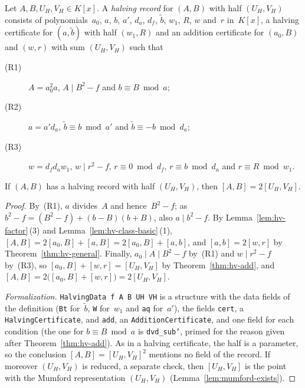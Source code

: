 \begin{definition}
\label{def:hv-record}
\leanok
{}
Let $A, B, U_H, V_H \in K[x]$. A \emph{halving record} for $(A, B)$ with half $(U_H, V_H)$
consists of polynomials~$a_0$, $a$, $b$, $a'$, $d_a$, $d_f$, $\tilde b$, $w_1$, $R$, $w$ and~$r$
in~$K[x]$, a halving certificate for $(a, \tilde b)$ with half $(w_1, R)$ and an addition
certificate for $(a_0, B)$ and $(w, r)$ with sum $(U_H, V_H)$ such that
\begin{description}
  \item[\textmd{(R1)}] $A = a_0^2 a$, $A \mid B^2 - f$ and $b \equiv B \bmod a$;
  \item[\textmd{(R2)}] $a = a' d_a$, $\tilde b \equiv b \bmod a'$ and
    $\tilde b \equiv -b \bmod d_a$;
  \item[\textmd{(R3)}] $w = d_f d_a w_1$, $w \mid r^2 - f$, $r \equiv 0 \bmod d_f$,
    $r \equiv b \bmod d_a$ and $r \equiv R \bmod w_1$.
\end{description}
\end{definition}

\begin{corollary}
\label{cor:hv-record}
\leanok
{}
If $(A, B)$ has a halving record with half $(U_H, V_H)$, then $[A, B] = 2[U_H, V_H]$.
\end{corollary}

\begin{proof}
\leanok
{}
By~(R1), $a$ divides~$A$ and hence~$B^2 - f$; as $b^2 - f = (B^2 - f) + (b - B)(b + B)$, also
$a \mid b^2 - f$. By Lemma~\ref{lem:hv-factor}\,(3) and Lemma~\ref{lem:hv-class-basic}\,(1),
$[A, B] = 2[a_0, B] + [a, B] = 2[a_0, B] + [a, b]$, and $[a, b] = 2[w, r]$ by
Theorem~\ref{thm:hv-general}. Finally, $a_0 \mid A \mid B^2 - f$ by~(R1) and $w \mid r^2 - f$
by~(R3), so $[a_0, B] + [w, r] = [U_H, V_H]$ by Theorem~\ref{thm:hv-add}, and
$[A, B] = 2\bigl([a_0, B] + [w, r]\bigr) = 2[U_H, V_H]$.

\emph{Formalization.} \texttt{HalvingData f A B UH VH} is a structure with the data fields of the
definition (\texttt{Bt} for~$\tilde b$, \texttt{W} for~$w_1$ and \texttt{aq} for~$a'$), the
fields \texttt{cert}, a \texttt{HalvingCertificate}, and \texttt{add}, an
\texttt{AdditionCertificate}, and one field for each condition (the one for
$b \equiv B \bmod a$ is \texttt{dvd\_sub'}, primed for the reason given after
Theorem~\ref{thm:hv-add}). As in a halving certificate, the half is a parameter, so the
conclusion $[A, B] = [U_H, V_H]^2$ mentions no field of the record. If moreover $(U_H, V_H)$ is
reduced, a separate check, then $[U_H, V_H]$ is the point with the Mumford representation
$(U_H, V_H)$ (Lemma~\ref{lem:mumford-exists}).
\end{proof}

